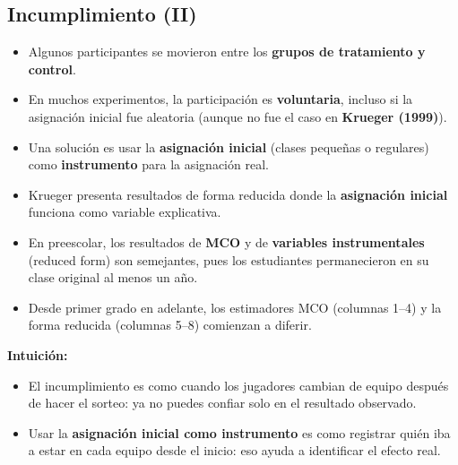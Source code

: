 \documentclass[12pt]{article}
\begin{document}
\subsection*{\noindent\textbf{Incumplimiento (II)}}

\begin{itemize}
    \item Algunos participantes se movieron entre los \textbf{grupos de tratamiento y control}.
    \item En muchos experimentos, la participación es \textbf{voluntaria}, incluso si la asignación inicial fue aleatoria (aunque no fue el caso en \textbf{Krueger (1999)}).
    \item Una solución es usar la \textbf{asignación inicial} (clases pequeñas o regulares) como \textbf{instrumento} para la asignación real.
    \item Krueger presenta resultados de forma reducida donde la \textbf{asignación inicial} funciona como variable explicativa.
    \item En preescolar, los resultados de \textbf{MCO} y de \textbf{variables instrumentales} (reduced form) son semejantes, pues los estudiantes permanecieron en su clase original al menos un año.  
    \item Desde primer grado en adelante, los estimadores MCO (columnas 1–4) y la forma reducida (columnas 5–8) comienzan a diferir.
\end{itemize}

\textbf{Intuición:}
\begin{itemize}
    \item El incumplimiento es como cuando los jugadores cambian de equipo después de hacer el sorteo: ya no puedes confiar solo en el resultado observado.
    \item Usar la \textbf{asignación inicial como instrumento} es como registrar quién iba a estar en cada equipo desde el inicio: eso ayuda a identificar el efecto real.
\end{itemize}
\end{document}
